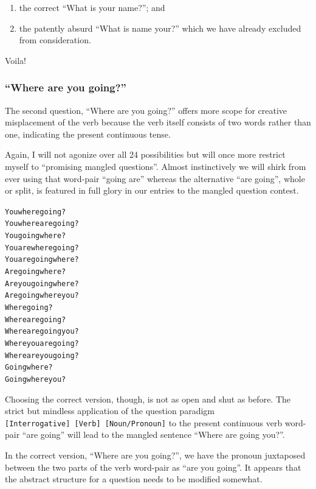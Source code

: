 \documentclass[
  a4paper,
]{article}
\providecommand{\tightlist}{%
  \setlength{\itemsep}{0pt}\setlength{\parskip}{0pt}}
\newcommand\pronoun[1]{\textcolor{pronoun}{#1}}
\newcommand\action[1]{\textcolor{action}{#1}}
\begin{document}
\begin{enumerate}
\def\labelenumi{\alph{enumi}.}
\tightlist
\item
  the correct ``What is your name?''; and
\item
  the patently absurd ``What is name your?'' which we have already
  excluded from consideration.
\end{enumerate}

Voila!

\hypertarget{where-are-you-going-1}{%
\subsubsection{``Where are you going?''}\label{where-are-you-going-1}}

The second question, ``Where are you going?'' offers more scope for
creative misplacement of the verb because the verb itself consists of
two words rather than one, indicating the present continuous tense.

Again, I will not agonize over all 24 possibilities but will once more
restrict myself to ``promising mangled questions''. Almost instinctively
we will shirk from ever using that word-pair ``going are'' whereas the
alternative ``are going'', whole or split, is featured in full glory in
our entries to the mangled question contest.

\begin{tcolorbox}
\begin{alltt}
\color{normal}
\pronoun{You} where \action{going}?
\pronoun{You} where \action{are going}?
\pronoun{You} \action{going} where?
\pronoun{You} \action{are} where \action{going}?
\pronoun{You} \action{are going} where?
\action{Are going} where?
\action{Are} \pronoun{you} \action{going} where?
\action{Are going} where \pronoun{you}?
Where \action{going}?
Where \action{are going}?
Where \action{are going} \pronoun{you}?
Where \pronoun{you} \action{are going}?
Where \action{are} \pronoun{you} \action{going}?
\action{Going} where?
\action{Going} where \pronoun{you}?
\end{alltt}
\end{tcolorbox}

Choosing the correct version, though, is not as open and shut as before.
The strict but mindless application of the question paradigm
\texttt{{[}Interrogative{]}\ {[}Verb{]}\ {[}Noun/Pronoun{]}} to the
present continuous verb word-pair ``are going'' will lead to the mangled
sentence ``Where are going you?''.

In the correct version, ``Where are you going?'', we have the pronoun
juxtaposed between the two parts of the verb word-pair as ``are you
going''. It appears that the abstract structure for a question needs to
be modified somewhat.
\end{document}
